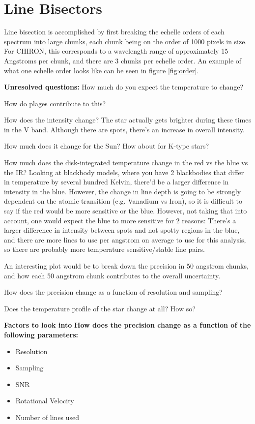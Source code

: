 \documentclass[iop]{emulateapj}
\begin{document}
\section{Line Bisectors}
\label{sec:bis}

Line bisection is accomplished by first breaking the echelle orders of each spectrum into large chunks, each chunk being on the order of 1000 pixels in size. For CHIRON, this corresponds to a wavelength range of approximately 15 Angstroms per chunk, and there are 3 chunks per echelle order. An example of what one echelle order looks like can be seen in figure \ref{fig:order}.

\textbf{Unresolved questions:}
How much do you expect the temperature to change?

How do plages contribute to this?

How does the intensity change?
The star actually gets brighter during these times in the V band. Although there are spots, there's an increase in overall intensity.

How much does it change for the Sun? How about for K-type stars?

How much does the disk-integrated temperature change in the red vs the blue vs the IR?
Looking at blackbody models, where you have 2 blackbodies that differ in temperature by several hundred Kelvin, there'd be a larger difference in intensity in the blue. However, the change in line depth is going to be strongly dependent on the atomic transition (e.g. Vanadium vs Iron), so it is difficult to say if the red would be more sensitive or the blue. However, not taking that into account, one would expect the blue to more sensitive for 2 reasons: There's a larger difference in intensity between spots and not spotty regions in the blue, and there are more lines to use per angstrom on average to use for this analysis, so there are probably more temperature sensitive/stable line pairs.

An interesting plot would be to break down the precision in 50 angstrom chunks, and how each 50 angstrom chunk contributes to the overall uncertainty.

How does the precision change as a function of resolution and sampling? 


Does the temperature profile of the star change at all? How so?

\textbf{Factors to look into}
\textbf{How does the precision change as a function of the following parameters:}
\begin{itemize}
\item Resolution
\item Sampling
\item SNR
\item Rotational Velocity
\item Number of lines used
\end{itemize}
\end{document}

